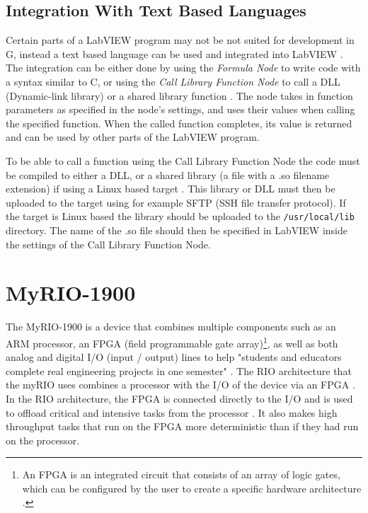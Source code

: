 \subsection{Integration With Text Based Languages}
Certain parts of a LabVIEW program may not be not suited for development in G, instead a text based language can be used and integrated into LabVIEW \cite{NationalInstruments2022BenefitsLabVIEW}. The integration can be either done by using the \textit{Formula Node} to write code with a syntax similar to C, or using the \textit{Call Library Function Node} to call a DLL (Dynamic-link library) or a shared library function \cite{Nationalinstruments2018CallNode}. The node takes in function parameters as specified in the node's settings, and uses their values when calling the specified function. When the called function completes, its value is returned and can be used by other parts of the LabVIEW program.

To be able to call a function using the Call Library Function Node the code must be compiled to either a DLL, or a shared library (a file with a .so filename extension) if using a Linux based target \cite{NationalInstruments2021CreatingTarget}. This library or DLL must then be uploaded to the target using for example SFTP (SSH file transfer protocol). If the target is Linux based the library should be uploaded to the \texttt{/usr/local/lib} directory. The name of the .so file should then be specified in LabVIEW inside the settings of the Call Library Function Node.

\section{MyRIO-1900}
The MyRIO-1900 is a device that combines multiple components such as an ARM processor, an FPGA (field programmable gate array)\footnote{An FPGA is an integrated circuit that consists of an array of logic gates, which can be configured by the user to create a specific hardware architecture \cite{Trochimiuk2021FPGAUsed}.}, as well as both analog and digital I/O (input / output) lines to help "students and educators complete real engineering projects in one semester" \cite{NationalInstruments2022MyRIO-1900}. The RIO architecture that the myRIO uses combines a processor with the I/O of the device via an FPGA \cite{NationalInstruments2020TheInnovation, NationalInstruments2022FromNI}. In the RIO architecture, the FPGA is connected directly to the I/O and is used to offload critical and intensive tasks from the processor \cite{NationalInstruments2022FromNI}. It also makes high throughput tasks that run on the FPGA more deterministic than if they had run on the processor.

